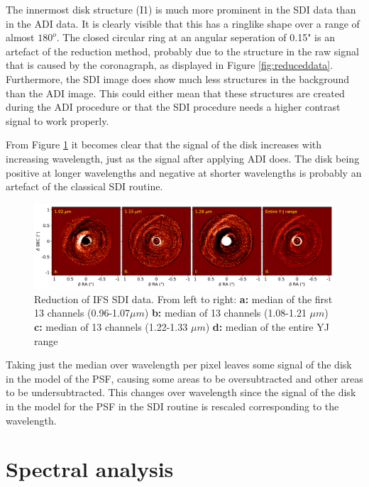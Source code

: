 \documentclass[twoside,single]{lion-msc}
\begin{document}
The innermost disk structure (I1) is much more prominent in the SDI data than in the ADI data. It is clearly visible that this has a ringlike shape over a range of almost $180^o$. The closed circular ring at an angular seperation of 0.15" is an artefact of the reduction method, probably due to the structure in the raw signal that is caused by the coronagraph, as displayed in Figure \ref{fig:reduceddata}. Furthermore, the SDI image does show much less structures in the background than the ADI image. This could either mean that these structures are created during the ADI procedure or that the SDI procedure needs a higher contrast signal to work properly.
\bigskip

From Figure \ref{fig:SDIcolor} it becomes clear that the signal of the disk increases with increasing wavelength, just as the signal after applying ADI does. The disk being positive at longer wavelengths and negative at shorter wavelengths is probably an artefact of the classical SDI routine. 

\begin{figure}[htb]
\centering
\includegraphics[trim={0cm 0cm 0cm 0cm},clip,width = \textwidth]{SDIwavelplot}
\caption{Reduction of IFS SDI data. From left to right: \textbf{a:} median of the first 13 channels (0.96-1.07$\mu m$) \textbf{b:} median of 13 channels (1.08-1.21 $\mu m$) \textbf{c:} median of 13 channels (1.22-1.33 $\mu m$) \textbf{d:} median of the entire YJ range}
\label{fig:SDIcolor}
\end{figure}

\noindent
Taking just the median over wavelength per pixel leaves some signal of the disk in the model of the PSF, causing some areas to be oversubtracted and other areas to be undersubtracted. This changes over wavelength since the signal of the disk in the model for the PSF in the SDI routine is rescaled corresponding to the wavelength.

\chapter{Spectral analysis}
\end{document}

